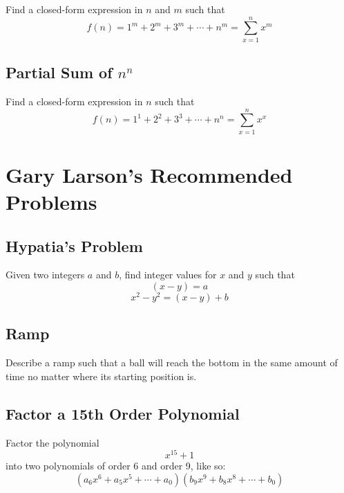 \documentclass[letterpaper, 11pt]{report}
\numberwithin{equation}{section}
\begin{document}
			
			Find a closed-form expression in $ n $ and $ m $ such that
			\begin{equation}
				f(n) = 1^m + 2^m + 3^m + \cdots + n^m = \sum_{x=1}^{n} x^m
			\end{equation}
			
			
		\section{Partial Sum of $ n^n $}
			
			
			Find a closed-form expression in $ n $ such that
			\begin{equation}
				f(n) = 1^1 + 2^2 + 3^3 + \cdots + n^n = \sum_{x=1}^{n} x^x
			\end{equation}
			
			
	
	
	\chapter{Gary Larson's Recommended Problems}
		
		
		
		\section{Hypatia's Problem}
			
			
			Given two integers \(a\) and \(b\), find integer values for \(x\) and \(y\) such that
			\begin{equation}
				(x-y) = a
			\end{equation}
			\begin{equation}
				x^2 - y^2 = (x-y) + b
			\end{equation}
			
			
		\section{Ramp}
			
			
			Describe a ramp such that a ball will reach the bottom in the same amount of time no matter where its starting position is.
			
			
		\section{Factor a 15th Order Polynomial}
			
			
			Factor the polynomial
			\begin{equation}
				x^{15} + 1
			\end{equation}
			into two polynomials of order 6 and order 9, like so:
			\begin{equation}
				(a_6x^6 + a_5x^5 + \cdots + a_0)(b_9x^9 + b_8x^8 + \cdots + b_0)
			\end{equation}
			
\end{document}
